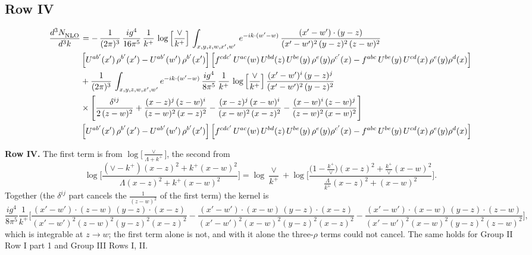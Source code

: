 \documentclass[9pt]{article}
\numberwithin{equation}{section}
\begin{document}
\subsection{Row IV}
\begin{align}
    \frac{d^{3}N_{\rm NLO}^{\rm}}{d^{3}k}  & = -\, \frac{1}{(2\pi)^{3}}\,\frac{ig^{4}}{16\pi^{5}}\,\frac{1}{k^{+}}\,\log{\left[\frac{\vee}{k^{+}}\right]}\,
    \int_{x,y,z,w,x',w'}\,e^{-ik\cdot (w^\prime-w)}\, \frac{(x'-w')\cdot (y-z)}{(x'-w')^{2}\,(y-z)^{2}\,(z-w)^{2}}\notag \\ &   \left[U^{ab'}(x')\,\rho^{b'}(x')-U^{ab'}(w')\,\rho^{b'}(x')\right] \left[f^{cdc'}\,U^{ac}(w)\,U^{bd}(z)\,U^{be}(y)\,\rho^{e}(y)\rho^{c'}(x)-f^{abc}\,U^{be}(y)\,U^{cd}(x)\,\rho^{e}(y)\rho^{d}(x)\right]
\notag \\ & +\frac{1}{(2\pi)^{3}}\,\int_{x,y,z,w,x',w'}e^{-ik\cdot (w^\prime-w)}\,\frac{ig^{4}}{8\pi^{5}}\,\frac{1}{k^{+}}\,\log{\left[\frac{\vee}{k^{+}}\right]}\,\frac{(x'-w')^{i}\,(y-z)^{j}}{(x'-w')^{2}\,(y-z)^{2}}\notag \\ & \times \Bigg[\frac{\delta^{ij}}{2\,(z-w)^{2}}+\frac{(x-z)^{j}\,(z-w)^{i}}{(z-w)^{2}\,(x-z)^{2}}-\frac{(x-z)^{j}\,(x-w)^{i}}{(x-w)^{2}\,(x-z)^{2}}-\frac{(x-w)^{i}\,(z-w)^{j}}{(z-w)^{2}\,(x-w)^{2}}\Bigg]\notag \\ & \left[U^{ab'}(x')\,\rho^{b'}(x')-U^{ab'}(w')\,\rho^{b'}(x')\right] \left[f^{cdc'}\,U^{ac}(w)\,U^{bd}(z)\,U^{be}(y)\,\rho^{e}(y)\rho^{c'}(x)-f^{abc}\,U^{be}(y)\,U^{cd}(x)\,\rho^{e}(y)\rho^{d}(x)\right]
\end{align}

\textbf{Row IV.} The first term is from $\log\big[\frac{\vee}{\Lambda+k^+}\big]$, the second from
\begin{equation*}
\log\Big[\frac{(\vee-k^{+})(x-z)^{2}+k^{+}(x-w)^{2}}{\Lambda(x-z)^{2}+k^{+}(x-w)^{2}}\Big]=\log\frac{\vee}{k^{+}}+\log\Big[\frac{\big(1-\frac{k^+}{\vee}\big)(x-z)^2+\frac{k^+}{\vee}(x-w)^2}{\frac{\Lambda}{k^+}(x-z)^2+(x-w)^2}\Big].
\end{equation*}
Together (the $\delta^{ij}$ part cancels the $\frac{1}{(z-w)^2}$ of the first term) the kernel is
\begin{equation*}
\frac{ig^4}{8\pi^5}\frac{1}{k^+}\Bigg[\frac{(x'-w')\cdot(z-w)\,(y-z)\cdot(x-z)}{(x'-w')^2(z-w)^2(y-z)^2(x-z)^2}-\frac{(x'-w')\cdot(x-w)\,(y-z)\cdot(x-z)}{(x'-w')^2(x-w)^2(y-z)^2(x-z)^2}-\frac{(x'-w')\cdot(x-w)\,(y-z)\cdot(z-w)}{(x'-w')^2(x-w)^2(y-z)^2(z-w)^2}\Bigg],
\end{equation*}
which is integrable at $z\to w$; the first term alone is not, and with it alone the three-$\rho$ terms could not cancel. The same holds for Group II Row I part 1 and Group III Rows I, II.
\end{document}
